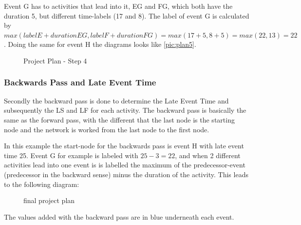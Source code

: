 Event G has to activities that lead into it, EG and FG, which both have the duration 5, but different time-labels (17 and 8). The label of event G is calculated by $ max(label E + duration EG, label F + duration FG) = max(17+5, 8+5) = max(22,13) = 22 $. Doing the same for event H the diagrams looks like \autoref{pic:plan5}.
\begin{figure}[h] 
\centerline{}
\caption{Project Plan - Step 4}
\label{pic:plan5}
\end{figure}
\subsubsection{Backwards Pass and Late Event Time}
 Secondly the backward pass is done to determine the Late Event Time and subsequently the LS and LF for each activity.
 The backward pass is basically the same as the forward pass, with the different that the last node is the starting node and the network is worked from the last node to the first node.

In this example the start-node for the backwards pass is event H with late event time 25. Event G for example is labeled with $ 25-3 = 22 $, and when 2 different activities lead into one event is is labelled the maximum of the predecessor-event (predecessor in the backward sense) minus the duration of the activity. This leads to the following diagram:
\begin{figure}[h] 
\centerline{}
\caption{final project plan}
\label{pic:plan6}
\end{figure}
The values added with the backward pass are in blue underneath each event.


